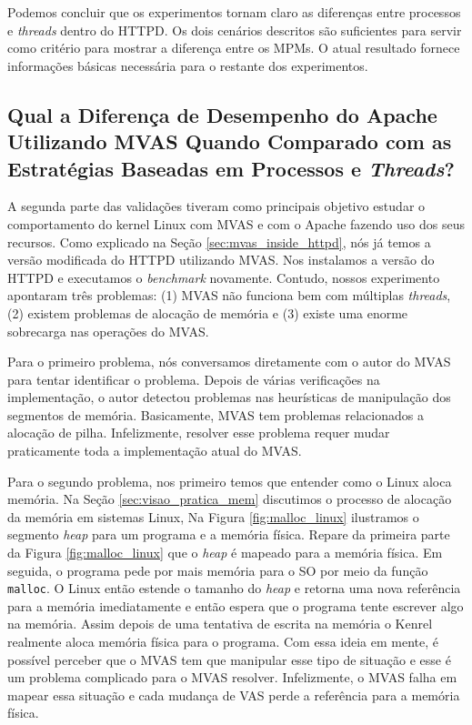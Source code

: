 Podemos concluir que os experimentos tornam claro as diferenças entre processos
e \emph{threads} dentro do HTTPD. Os dois cenários descritos são suficientes
para servir como critério para mostrar a diferença entre os MPMs. O atual
resultado fornece informações básicas necessária para o restante dos
experimentos.

\subsection{Qual a Diferença de Desempenho do Apache Utilizando MVAS Quando
Comparado com as Estratégias Baseadas em Processos e \emph{Threads}?}

A segunda parte das validações tiveram como principais objetivo estudar o
comportamento do kernel Linux com MVAS e com o Apache fazendo uso dos seus
recursos. Como explicado na Seção \ref{sec:mvas_inside_httpd}, nós já temos a
versão modificada do HTTPD utilizando MVAS. Nos instalamos a versão do HTTPD e
executamos o \emph{benchmark} novamente. Contudo, nossos experimento apontaram
três problemas: (1) MVAS não funciona bem com múltiplas \emph{threads}, (2)
existem problemas de alocação de memória e (3) existe uma enorme sobrecarga nas
operações do MVAS.

Para o primeiro problema, nós conversamos diretamente com o autor do MVAS para
tentar identificar o problema. Depois de várias verificações na implementação,
o autor detectou problemas nas heurísticas de manipulação dos segmentos de
memória.  Basicamente, MVAS tem problemas relacionados a alocação de
pilha.  Infelizmente, resolver esse problema requer mudar praticamente
toda a implementação atual do MVAS.


Para o segundo problema, nos primeiro temos que entender como o Linux aloca
memória. Na Seção \ref{sec:visao_pratica_mem} discutimos o processo de alocação
da memória em sistemas Linux, Na Figura \ref{fig:malloc_linux} ilustramos o
segmento \emph{heap} para um programa e a memória física. Repare da primeira
parte da Figura \ref{fig:malloc_linux} que o \emph{heap} é mapeado para a
memória física. Em seguida, o programa pede por mais memória para o SO por meio
da função \texttt{malloc}. O Linux então estende o tamanho do \emph{heap} e
retorna uma nova referência para a memória imediatamente e então espera que o
programa tente escrever algo na memória. Assim depois de uma tentativa de
escrita na memória o Kenrel realmente aloca memória física para o programa. Com
essa ideia em mente, é possível perceber que o MVAS tem que manipular esse tipo
de situação e esse é um problema complicado para o MVAS resolver. Infelizmente,
o MVAS falha em mapear essa situação e cada mudança de VAS perde a referência
para a memória física.

